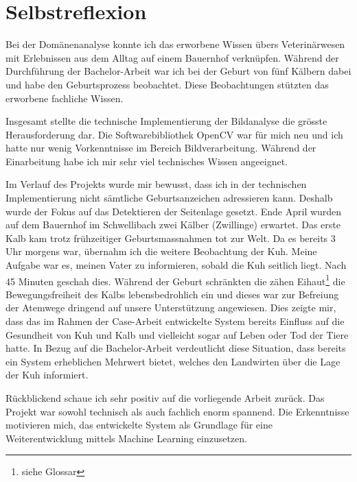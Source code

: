 

\chapter{Selbstreflexion}

Bei der Domänenanalyse konnte ich das erworbene Wissen übers Veterinärwesen mit Erlebnissen aus dem Alltag auf einem Bauernhof verknüpfen. Während der Durchführung der Bachelor-Arbeit war ich bei der Geburt von fünf Kälbern dabei und habe den Geburtsprozess beobachtet. Diese Beobachtungen stützten das erworbene fachliche Wissen.

Insgesamt stellte die technische Implementierung der Bildanalyse die grösste Herausforderung dar. Die Softwarebibliothek OpenCV war für mich neu und ich hatte nur wenig Vorkenntnisse im Bereich Bildverarbeitung. Während der Einarbeitung habe ich mir sehr viel technisches Wissen angeeignet. 

Im Verlauf des Projekts wurde mir bewusst, dass ich in der technischen Implementierung nicht sämtliche Geburtsanzeichen adressieren kann. Deshalb wurde der Fokus auf das Detektieren der Seitenlage gesetzt. Ende April wurden auf dem Bauernhof im Schwellibach zwei Kälber (Zwillinge) erwartet. Das erste Kalb kam trotz frühzeitiger Geburtsmassnahmen tot zur Welt. Da es bereits 3 Uhr morgens war, übernahm ich die weitere Beobachtung der Kuh. Meine Aufgabe war es, meinen Vater zu informieren, sobald die Kuh seitlich liegt. Nach 45 Minuten geschah dies. Während der Geburt schränkten die zähen \gls{Eihaut}\footnote{\label{glossar-eihaut}siehe Glossar} die Bewegungsfreiheit des Kalbs lebensbedrohlich ein und dieses war zur Befreiung der Atemwege dringend auf unsere Unterstützung angewiesen. Dies zeigte mir, dass das im Rahmen der Case-Arbeit entwickelte System bereits Einfluss auf die Gesundheit von Kuh und Kalb und vielleicht sogar auf Leben oder Tod der Tiere hatte. In Bezug auf die Bachelor-Arbeit verdeutlicht diese Situation, dass bereits ein System erheblichen Mehrwert bietet, welches den Landwirten über die Lage der Kuh informiert. 

Rückblickend schaue ich sehr positiv auf die vorliegende Arbeit zurück. Das Projekt war sowohl technisch als auch fachlich enorm spannend. Die Erkenntnisse motivieren mich, das entwickelte System als Grundlage für eine Weiterentwicklung mittels Machine Learning einzusetzen.